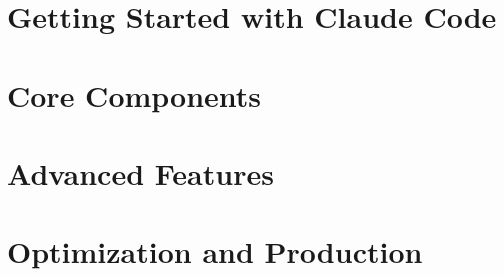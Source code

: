 \documentclass[12pt,twoside,openright]{book}
\begin{document}
\frontmatter



\tableofcontents
\listoffigures
\listoftables


\mainmatter

\part{Getting Started with Claude Code}




\part{Core Components}





\part{Advanced Features}






\part{Optimization and Production}




\appendix



\backmatter
\glsaddall  %
\printglossaries
\printindex
\end{document}

